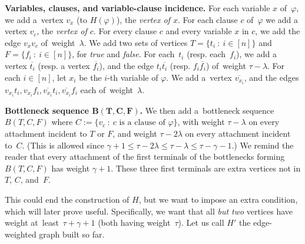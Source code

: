 \documentclass[a4paper,UKenglish,cleveref,hyperref,autoref]{lipics-v2021}
\begin{document}

\medskip

\textbf{Variables, clauses, and variable-clause incidence.}
For each variable $x$ of~$\varphi$, we add a~vertex $v_x$ (to $H(\varphi)$), the \emph{vertex of $x$}.
For each clause $c$ of~$\varphi$ we add a vertex $v_c$, the \emph{vertex of $c$}.
For every clause $c$ and every variable $x$ in $c$, we add the edge $v_xv_c$ of~weight~$\lambda$.
We add two sets of vertices $T = \{t_i \ : \ i \in [n]\}$ and $F = \{f_i \ : \ i \in [n]\}$, for \emph{true} and \emph{false}.
For each~$t_i$ (resp. each~$f_i$), we add a vertex $\overline{t_i}$ (resp. a vertex $\overline{f_i}$), and the edge $t_i \overline{t_i}$ (resp. $f_i \overline{f_i}$) of~weight $\tau - \lambda$.
For each $i \in [n]$, let $x_i$ be the $i$-th variable of $\varphi$.
We add a~vertex $\overline{v_{x_i}}$, and the edges $v_{x_i}t_i, v_{x_i}f_i, \overline{v_{x_i}}t_i, \overline{v_{x_i}}f_i$ each of~weight~$\lambda$.

\medskip

\textbf{Bottleneck sequence $\bm{B(T,C,F)}$.}
We then add a~bottleneck sequence $B(T,C,F)$ where $C := \{v_c \ : \ c\text{ is a clause of } \varphi \}$, with weight $\tau - \lambda$ on every attachment incident to $T$ or $F$, and weight $\tau - 2\lambda$ on every attachment incident to~$C$.
(This is allowed since $\gamma + 1 \leqslant \tau - 2\lambda \leqslant \tau - \lambda \leqslant \tau - \gamma - 1$.)
We remind the reader that every attachment of the first terminals of the bottlenecks forming $B(T,C,F)$ has weight $\gamma+1$.
These three first terminals are extra vertices not in $T$, $C$, and~$F$.

\medskip

This could end the construction of $H$, but we want to impose an extra condition, which will later prove useful.
Specifically, we want that all \emph{but two} vertices have weight at~least~$\tau + \gamma + 1$ (both having weight~$\tau$).
Let us call $H'$ the edge-weighted graph built so far. 
\end{document}
